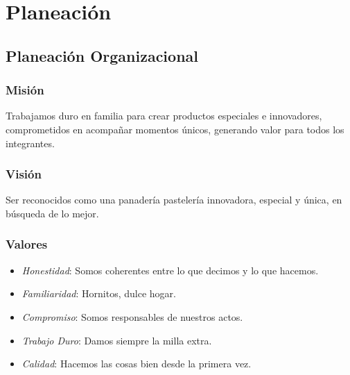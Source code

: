 \chapter{Planeaci\'on}
\section{Planeaci\'on Organizacional}
\subsection{Misi\'on}
Trabajamos duro en familia para crear productos especiales e innovadores, comprometidos en acompa\~nar momentos \'unicos, generando valor para todos los integrantes.%
%
\subsection{Visi\'on}
Ser reconocidos como una panader\'ia pasteler\'ia innovadora, especial y \'unica, en b\'usqueda de lo mejor.%
%
\subsection{Valores}
\begin{itemize}
\item \emph{Honestidad}: Somos coherentes entre lo que decimos y lo que hacemos.%
\item \emph{Familiaridad}: Hornitos, dulce hogar.%
\item \emph{Compromiso}: Somos responsables de nuestros actos.%
\item \emph{Trabajo Duro}: Damos siempre la milla extra.%
\item \emph{Calidad}: Hacemos las cosas bien desde la primera vez.%
\end{itemize}
%
